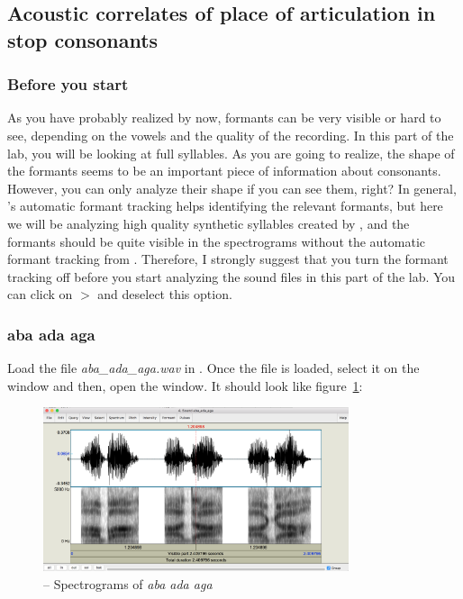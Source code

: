 \subsection{Acoustic correlates of place of articulation in stop consonants}

\subsubsection{Before you start}

As you have probably realized by now, formants can be very visible or hard to see, depending on the vowels and the quality of the recording. In this part of the lab, you will be looking at full syllables. As you are going to realize, the shape of the formants seems to be an important piece of information about consonants. However, you can only analyze their shape if you can see them, right? In general, \Praat{}'s automatic formant tracking helps identifying the relevant formants, but here we will be analyzing high quality synthetic syllables created by , and the formants should be quite visible in the spectrograms without the automatic formant tracking from \Praat{}. Therefore, I strongly suggest that you turn the formant tracking off before you start analyzing the sound files in this part of the lab. You can click on  $>$  and deselect this option.

\subsubsection{aba ada aga}

Load the file \emph{aba\_ada\_aga.wav} in \Praat{}. Once the file is loaded, select it on the  window and then, open the  window. It should look like figure~\ref{step1triplet}:

\begin{figure}[!tbp]
\caption{\Praat{} -- Spectrograms of \emph{aba ada aga}}
\label{step1triplet}
	\begin{center}
		\includegraphics[width=0.8\textwidth]{./figures/Praat_B-01-aba-ada-aga}
	\end{center}
\end{figure}

